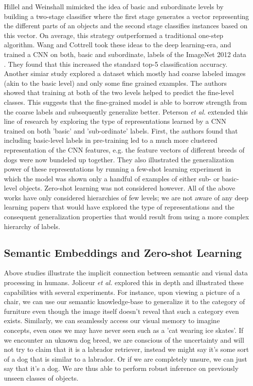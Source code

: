\documentclass[12pt]{report}
\begin{document}
Hillel and Weinshall \cite{Hillel2007} mimicked the idea of basic and subordinate levels by building a two-stage classifier where the first stage generates a vector representing the different parts of an objects and the second stage classifies instances based on this vector. On average, this strategy outperformed a traditional one-step algorithm. Wang and Cottrell \cite{Wang2015} took these ideas to the deep learning-era, and trained a CNN on both, basic and subordinate, labels of the ImageNet 2012 data \cite{Russakovsky2015}. They found that this increased the standard top-5 classification accuracy. Another simiar study \cite{Lei2018} explored a dataset which mostly had coarse labeled images (akin to the basic level) and only some fine grained examples. The authors showed that training at both of the two levels helped to predict the fine-level classes. This suggests that the fine-grained model is able to borrow strength from the coarse labels and subsequently generalize better. Peterson \textit{et al.} \cite{Peterson2018} extended this line of research by exploring the type of representations learned by a CNN trained on both 'basic' and 'sub-ordinate' labels. First, the authors found that including basic-level labels in pre-training led to a much more clustered representation of the CNN features, e.g. the feature vectors of different breeds of dogs were now bundeled up together. They also illustrated the generalization power of these representations by running a few-shot learning experiment in which the model was shown only a handful of examples of either sub- or basic-level objects. Zero-shot learning was not considered however. All of the above works have only considered hierarchies of few levels; we are not aware of any deep learning papers that would have explored the type of representations and the consequent generalization properties that would result from using a more complex hierarchy of labels.

\subsection{Semantic Embeddings and Zero-shot Learning} \label{sec:semlit}
Above studies illustrate the implicit connection between semantic and visual data processing in humans. Joliceur \textit{et al.} \cite{Joliceur1984} explored this in depth and illustrated these capabilities with several experiments. For instance, upon viewing a picture of a chair, we can use our semantic knowledge-base to generalize it to the category of furniture even though the image itself doesn't reveal that such a category even exists. Similarly, we can seamlessly access our visual memory to imagine concepts, even ones we may have never seen such as a 'cat wearing ice skates'. If we encounter an uknown dog breed, we are conscious of the uncertainty and will not try to claim that it is a labrador retriever, instead we might say it's some sort of a dog that is similar to a labrador. Or if we are completely unsure, we can just say that it's a dog. We are thus able to perform robust inference on previously unseen classes of objects.
\end{document}
